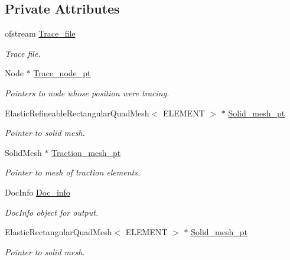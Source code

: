 \subsection*{Private Attributes}
\begin{DoxyCompactItemize}
\item 
ofstream \hyperlink{classCantileverProblem_af1e298e0b99bddc89b20da6ad4bb41e1}{Trace\+\_\+file}
\begin{DoxyCompactList}\small\item\em Trace file. \end{DoxyCompactList}\item 
Node $\ast$ \hyperlink{classCantileverProblem_a7b91e041c3e5336b62ced10774917370}{Trace\+\_\+node\+\_\+pt}
\begin{DoxyCompactList}\small\item\em Pointers to node whose position we\textquotesingle{}re tracing. \end{DoxyCompactList}\item 
Elastic\+Refineable\+Rectangular\+Quad\+Mesh$<$ E\+L\+E\+M\+E\+NT $>$ $\ast$ \hyperlink{classCantileverProblem_a263ff19e4aa0fa4391582242763f08f1}{Solid\+\_\+mesh\+\_\+pt}
\begin{DoxyCompactList}\small\item\em Pointer to solid mesh. \end{DoxyCompactList}\item 
Solid\+Mesh $\ast$ \hyperlink{classCantileverProblem_a52485434aab5d653010c48a0b0f89088}{Traction\+\_\+mesh\+\_\+pt}
\begin{DoxyCompactList}\small\item\em Pointer to mesh of traction elements. \end{DoxyCompactList}\item 
Doc\+Info \hyperlink{classCantileverProblem_a2d230bb59f229cf02a06a50493dd48e4}{Doc\+\_\+info}
\begin{DoxyCompactList}\small\item\em Doc\+Info object for output. \end{DoxyCompactList}\item 
Elastic\+Rectangular\+Quad\+Mesh$<$ E\+L\+E\+M\+E\+NT $>$ $\ast$ \hyperlink{classCantileverProblem_af46dcd5eca58d44f1078e54f7779f0d5}{Solid\+\_\+mesh\+\_\+pt}
\begin{DoxyCompactList}\small\item\em Pointer to solid mesh. \end{DoxyCompactList}\end{DoxyCompactItemize}


